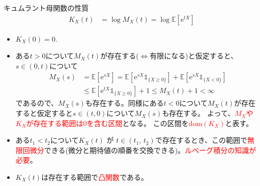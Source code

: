 \documentclass[lualatex,handout]{beamer}
\newcommand{\emm}[1]{\textcolor{red}{#1}}
\newcommand{\expt}[1]{\mathbb{E}\left[#1\right]}
\theoremstyle{definition}
\begin{document}
\begin{frame}{キュムラント母関数の性質}
\small
\begin{align*}
K_X(t) &= \log M_X(t) = \log \expt{\mathrm{e}^{tX}}
\end{align*}
\begin{itemize}
\setlength{\itemsep}{1em}
\item $K_X(0) = 0$.
\item ある$t>0$について$M_X(t)$が存在する($\iff$有限になる)と仮定すると、$s\in(0, t)$について
\begin{align*}
M_X(s) &= \expt{\mathrm{e}^{sX}}
= \expt{\mathrm{e}^{sX}\mathbb{1}_{\{X\ge 0\}}}+\expt{\mathrm{e}^{sX}\mathbb{1}_{\{X< 0\}}}\\
&\le \expt{\mathrm{e}^{tX}\mathbb{1}_{\{X\ge 0\}}}+1
\le M_X(t)+1<\infty
\end{align*}
であるので、$M_X(s)$も存在する。同様にある$t<0$について$M_X(t)$が存在すると仮定すると$s\in(t,0)$について$M_X(s)$も存在する。
よって、\emm{$M_X$や$K_X$が存在する範囲は0を含む区間}となる。
この区間を\emm{$\mathrm{dom}(K_X)$}と表す。
\item ある$t_1<t_2$について$K_X(t)$ が $t\in(t_1,\,t_2)$で存在するとき、この範囲で\emm{無限回微分}できる(微分と期待値の順番を交換できる)。\emm{ルベーグ積分の知識が必要}。
\item $K_X(t)$は存在する範囲で\emm{凸関数}である。
\end{itemize}
\end{frame}
\end{document}
